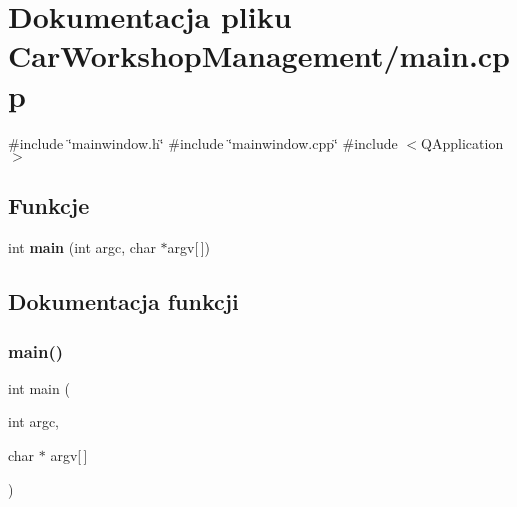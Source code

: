 \section{Dokumentacja pliku Car\+Workshop\+Management/main.cpp}
\label{main_8cpp}
{\ttfamily \#include \char`\"{}mainwindow.\+h\char`\"{}}\newline
{\ttfamily \#include \char`\"{}mainwindow.\+cpp\char`\"{}}\newline
{\ttfamily \#include $<$Q\+Application$>$}\newline
\subsection*{Funkcje}
\begin{DoxyCompactItemize}
\item 
int \textbf{ main} (int argc, char $\ast$argv[$\,$])
\end{DoxyCompactItemize}


\subsection{Dokumentacja funkcji}
\mbox{\label{main_8cpp_a0ddf1224851353fc92bfbff6f499fa97}} 
\subsubsection{main()}
{\footnotesize\ttfamily int main (\begin{DoxyParamCaption}\item[{int}]{argc,  }\item[{char $\ast$}]{argv[$\,$] }\end{DoxyParamCaption})}

